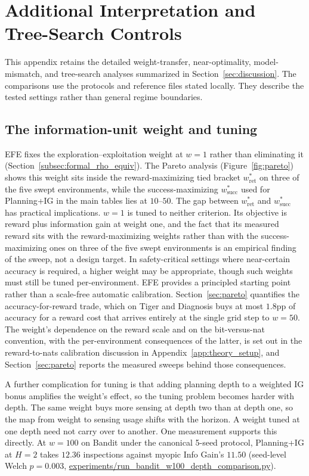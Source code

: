 \section{Additional Interpretation and Tree-Search Controls}
\label{app:interpretation}

This appendix retains the detailed weight-transfer, near-optimality, model-mismatch, and tree-search analyses summarized in Section~\ref{sec:discussion}. The comparisons use the protocols and reference files stated locally. They describe the tested settings rather than general regime boundaries.

\subsection{The information-unit weight and tuning}
EFE fixes the exploration--exploitation weight at $w{=}1$ rather than eliminating it (Section~\ref{subsec:formal_rho_equiv}). The Pareto analysis (Figure~\ref{fig:pareto}) shows this weight sits inside the reward-maximizing tied bracket $w^*_{\text{ret}}$ on three of the five swept environments, while the success-maximizing $w^*_{\text{succ}}$ used for Planning+IG in the main tables lies at $10$--$50$. The gap between $w^*_{\text{ret}}$ and $w^*_{\text{succ}}$ has practical implications. $w{=}1$ is tuned to neither criterion. Its objective is reward plus information gain at weight one, and the fact that its measured reward sits with the reward-maximizing weights rather than with the success-maximizing ones on three of the five swept environments is an empirical finding of the sweep, not a design target. In safety-critical settings where near-certain accuracy is required, a higher weight may be appropriate, though such weights must still be tuned per-environment. EFE provides a principled starting point rather than a scale-free automatic calibration. Section~\ref{sec:pareto} quantifies the accuracy-for-reward trade, which on Tiger and Diagnosis buys at most $1.8$pp of accuracy for a reward cost that arrives entirely at the single grid step to $w{=}50$. The weight's dependence on the reward scale and on the bit-versus-nat convention, with the per-environment consequences of the latter, is set out in the reward-to-nats calibration discussion in Appendix~\ref{app:theory_setup}, and Section~\ref{sec:pareto} reports the measured sweeps behind those consequences.

A further complication for tuning is that adding planning depth to a weighted IG bonus amplifies the weight's effect, so the tuning problem becomes harder with depth. The same weight buys more sensing at depth two than at depth one, so the map from weight to sensing usage shifts with the horizon. A weight tuned at one depth need not carry over to another. One measurement supports this directly. At $w{=}100$ on Bandit under the canonical 5-seed protocol, Planning+IG at $H{=}2$ takes $12.36$ inspections against myopic Info Gain's $11.50$ (seed-level Welch $p{=}0.003$, \url{experiments/run_bandit_w100_depth_comparison.py}).

